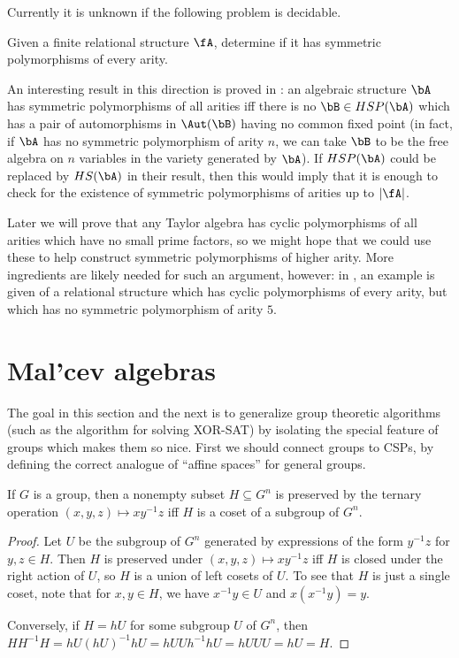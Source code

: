 Currently it is unknown if the following problem is decidable.

\begin{prob} Given a finite relational structure $\fA$, determine if it has symmetric polymorphisms of every arity.
\end{prob}

An interesting result in this direction is proved in \cite{symmetric-polymorphisms}: an algebraic structure $\bA$ has symmetric polymorphisms of all arities iff there is no $\bB \in HSP(\bA)$ which has a pair of automorphisms in $\Aut(\bB)$ having no common fixed point (in fact, if $\bA$ has no symmetric polymorphism of arity $n$, we can take $\bB$ to be the free algebra on $n$ variables in the variety generated by $\bA$). If $HSP(\bA)$ could be replaced by $HS(\bA)$ in their result, then this would imply that it is enough to check for the existence of symmetric polymorphisms of arities up to $|\fA|$.

Later we will prove that any Taylor algebra has cyclic polymorphisms of all arities which have no small prime factors, so we might hope that we could use these to help construct symmetric polymorphisms of higher arity. More ingredients are likely needed for such an argument, however: in \cite{symmetric-polymorphisms}, an example is given of a relational structure which has cyclic polymorphisms of every arity, but which has no symmetric polymorphism of arity $5$.


\section{Mal'cev algebras}

The goal in this section and the next is to generalize group theoretic algorithms (such as the algorithm for solving XOR-SAT) by isolating the special feature of groups which makes them so nice. First we should connect groups to CSPs, by defining the correct analogue of ``affine spaces'' for general groups.

\begin{prop} If $G$ is a group, then a nonempty subset $H \subseteq G^n$ is preserved by the ternary operation $(x,y,z) \mapsto xy^{-1}z$ iff $H$ is a coset of a subgroup of $G^n$.
\end{prop}
\begin{proof} Let $U$ be the subgroup of $G^n$ generated by expressions of the form $y^{-1}z$ for $y,z \in H$. Then $H$ is preserved under $(x,y,z) \mapsto xy^{-1}z$ iff $H$ is closed under the right action of $U$, so $H$ is a union of left cosets of $U$. To see that $H$ is just a single coset, note that for $x,y \in H$, we have $x^{-1}y \in U$ and $x(x^{-1}y) = y$.

Conversely, if $H = hU$ for some subgroup $U$ of $G^n$, then $HH^{-1}H = hU(hU)^{-1}hU = hUUh^{-1}hU = hUUU = hU = H$.
\end{proof}

